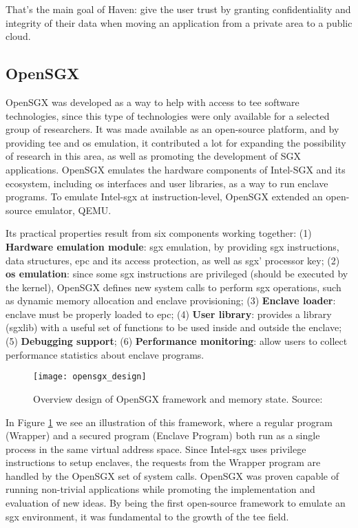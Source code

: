 That's the main goal of Haven: give the user trust by granting confidentiality and integrity of their data when moving an application from a private area to a public cloud. 


\subsection{OpenSGX}
\label{ssec:openSGX}

OpenSGX \cite{opensgx_paper} was developed as a way to help with access to \gls{tee} software technologies, since this type of technologies were only available for a selected group of researchers. 
It was made available as an open-source platform, and by providing \gls{tee} and \gls{os} emulation, it contributed a lot for expanding the possibility of research in this area, as well as promoting the development of SGX applications. 
OpenSGX emulates the hardware components of Intel-SGX and its ecosystem, including \gls{os} interfaces and user libraries, as a way to run enclave programs. To emulate Intel-\gls{sgx} at instruction-level, OpenSGX extended an open-source emulator, QEMU.

Its practical properties result from six components working together: 
(1) \textbf{Hardware emulation module}: \gls{sgx} emulation, by providing \gls{sgx} instructions, data structures, \gls{epc} and its access protection, as well as \gls{sgx}' processor key; 
(2) \textbf{\gls{os} emulation}: since some \gls{sgx} instructions are privileged (should be executed by the kernel), OpenSGX defines new system calls to perform \gls{sgx} operations, such as dynamic memory allocation and enclave provisioning; 
(3) \textbf{Enclave loader}: enclave must be properly loaded to \gls{epc}; 
(4) \textbf{User library}: provides a library (sgxlib) with a useful set of functions to be used inside and outside the enclave; 
(5) \textbf{Debugging support}; 
(6) \textbf{Performance monitoring}: allow users to collect performance statistics about enclave programs.

\begin{figure}[htbp]
	\centering
	{\texttt{[image: opensgx\_design]}}
	\caption{Overview design of OpenSGX framework and memory state. Source: \cite{opensgx_paper}}
	\label{fig:openSGXDesign}
\end{figure}

In Figure \ref{fig:openSGXDesign} we see an illustration of this framework, where a regular program (Wrapper) and a secured program (Enclave Program) both run as a single process in the same virtual address space. Since Intel-\gls{sgx} uses privilege instructions to setup enclaves, the requests from the Wrapper program are handled by the OpenSGX set of system calls.
OpenSGX was proven capable of running non-trivial applications while promoting the implementation and evaluation of new ideas. By being the first open-source framework to emulate an \gls{sgx} environment, it was  fundamental to the growth of the \gls{tee} field.


